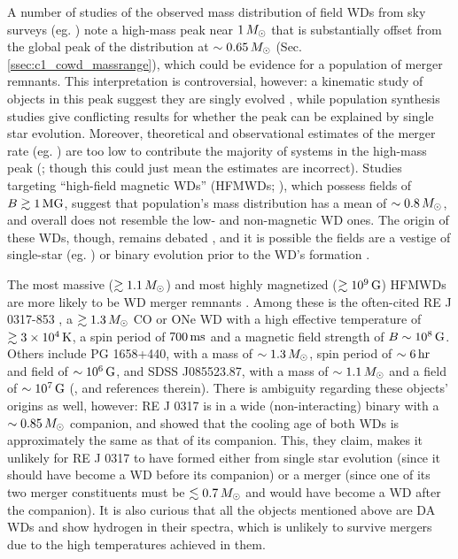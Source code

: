 A number of studies of the observed mass distribution of field WDs from sky surveys (eg. \citealt{liebbh05, giambd12, klei+13, reba+15a, reba+15b}) note a high-mass peak near $1\,\Msun$ that is substantially offset from the global peak of the distribution at $\sim0.65\,\Msun$ (Sec. \ref{ssec:c1_cowd_massrange}), which could be evidence for a population of merger remnants.  This interpretation is controversial, however: a kinematic study of objects in this peak suggest they are singly evolved \citep{weggp12}, while population synthesis studies \citep{reba+15a, reba+15b, trem+16} give conflicting results for whether the peak can be explained by single star evolution.  Moreover, theoretical and observational estimates of the merger rate (eg. \citealt{badem12, toonnp12}) are too low to contribute the majority of systems in the high-mass peak (\citealt{giambd12, reba+15b, trem+16}; though this could just mean the estimates are incorrect).  Studies targeting ``high-field magnetic WDs'' (HFMWDs; \citealt{kepl+13, garc+16}), which possess fields of $B \gtrsim1\,\mathrm{MG}$, suggest that population's mass distribution has a mean of $\sim0.8\,\Msun$, and overall does not resemble the low- and non-magnetic WD ones.  The origin of these WDs, though, remains debated \citep{brig+15, garc+16}, and it is possible the fields are a vestige of single-star (eg. \citealt{wickf05, kisst15}) or binary evolution prior to the WD's formation \citep{brig+15}.  

The most massive ($\gtrsim1.1\,\Msun$) and most highly magnetized ($\gtrsim10^9\,\mathrm{G}$) HFMWDs are more likely to be WD merger remnants \citep{garc+12, kule+13, wicktf14}.  Among these is the often-cited RE J 0317-853 \citep{bars+95, kube+10}, a $\gtrsim1.3\,\Msun$ CO or ONe WD with a high effective temperature of $\gtrsim3\times10^4\,\mathrm{K}$, a spin period of $700\,\mathrm{ms}$ and a magnetic field strength of $B\sim10^8\,\mathrm{G}$.  Others include PG 1658+440, with a mass of $\sim1.3\,\Msun$, spin period of $\sim6\,\mathrm{hr}$ and field of $\sim10^6\,\mathrm{G}$, and SDSS J085523.87, with a mass of $\sim1.1\,\Msun$ and a field of $\sim10^7\,\mathrm{G}$ (\citealt{ferrdg15}, and references therein).  There is ambiguity regarding these objects' origins as well, however: RE J 0317 is in a wide (non-interacting) binary with a $\sim0.85\,\Msun$ companion, and \cite{kube+10} showed that the cooling age of both WDs is approximately the same as that of its companion.  This, they claim, makes it unlikely for RE J 0317 to have formed either from single star evolution (since it should have become a WD before its companion) or a merger (since one of its two merger constituents must be $\lesssim0.7\,\Msun$ and would have become a WD after the companion).  It is also curious that all the objects mentioned above are DA WDs and show hydrogen in their spectra, which is unlikely to survive mergers due to the high temperatures achieved in them.

